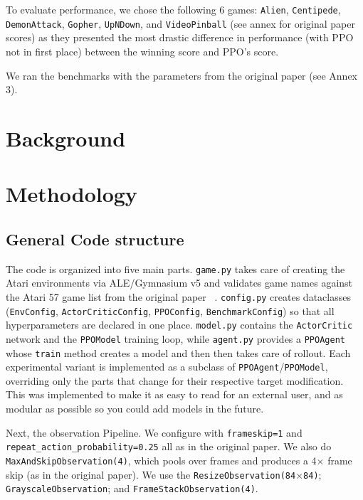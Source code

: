 \documentclass{article}
\begin{document}
To evaluate performance, we chose the following 6 games: \texttt{Alien}, \texttt{Centipede}, \texttt{DemonAttack}, \texttt{Gopher}, \texttt{UpNDown}, and \texttt{VideoPinball} (see annex for original paper scores) as they presented
the most drastic difference in performance (with PPO not in first place) between the winning score and PPO's score.

We ran the benchmarks with the parameters from the original paper (see Annex 3).


\section{Background} %


\section{Methodology} %

\subsection{General Code structure} %

The code is organized into five main parts.
\texttt{game.py} takes care of creating the Atari environments 
via ALE/Gymnasium v5 and validates game names against the Atari 
57 game list from the original paper ~\cite{PPOPaper}.
\texttt{config.py} creates dataclasses (\texttt{EnvConfig}, 
\texttt{ActorCriticConfig}, \texttt{PPOConfig}, \texttt{BenchmarkConfig}) 
so that all hyperparameters are declared in one place.
\texttt{model.py} contains the \texttt{ActorCritic} network and 
the \texttt{PPOModel} training loop, while \texttt{agent.py} 
provides a \texttt{PPOAgent} whose \texttt{train} method 
creates a model and then then takes care of rollout.
Each experimental variant is implemented as a subclass of 
\texttt{PPOAgent}/\texttt{PPOModel}, overriding only the parts 
that change for their respective target modification. 
This was implemented to make it as easy to read
for an external user, and as modular as possible so you could 
add models in the future.

Next, the observation Pipeline.
We configure with \texttt{frameskip=1} and 
\texttt{repeat\_action\_probability=0.25} all as in the original paper.
We also do \texttt{MaxAndSkipObservation(4)}, which pools over 
frames and produces a 4$\times$ frame skip (as in the original paper). 
We use the 
\texttt{ResizeObservation(84$\times$84)}; \texttt{GrayscaleObservation};
 and \texttt{FrameStackObservation(4)}.
\end{document}

